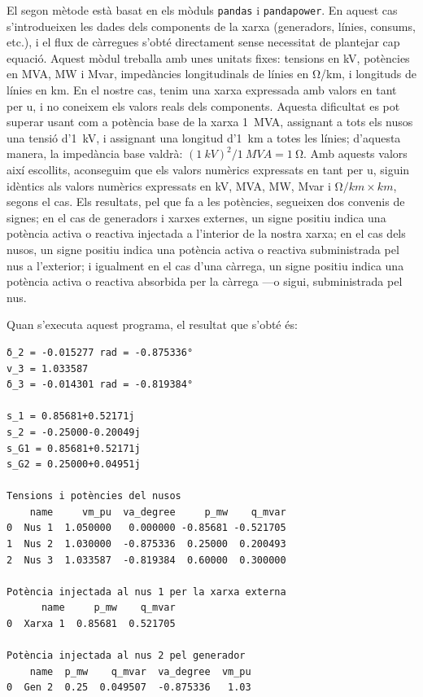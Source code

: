 El segon mètode està basat en els mòduls \texttt{pandas} i \texttt{pandapower}. En aquest cas s'introdueixen les dades dels components de la xarxa (generadors, línies, consums, etc.), i el flux de càrregues s'obté directament sense necessitat de plantejar cap equació. Aquest mòdul treballa amb unes unitats fixes: tensions en  \unit{kV}, potències en  \unit{MVA}, \unit{MW} i \unit{Mvar}, impedàncies longitudinals de línies en \unit{\ohm/km}, i longituds de línies en  \unit{km}. En el nostre cas, tenim una xarxa expressada amb valors en tant per u, i no coneixem els valors reals dels components. Aquesta dificultat es pot superar usant com a potència base de la xarxa \qty{1}{MVA}, assignant a tots els nusos una tensió d'\qty{1}{kV}, i assignant una longitud d'\qty{1}{km} a totes les línies; d'aquesta manera, la impedància base valdrà: $(\qty{1}{kV})^2/\qty{1}{MVA} = \qty{1}{\ohm}$. Amb aquests valors així escollits, aconseguim que els valors numèrics expressats en tant per u, siguin idèntics als valors numèrics expressats en
\unit{kV},  \unit{MVA}, \unit{MW}, \unit{Mvar} i $\unit{\ohm/km}\times\unit{km}$, segons el cas. Els resultats, pel que fa a les potències,  segueixen dos convenis de signes; en el cas de generadors i xarxes externes, un signe positiu indica una potència activa o reactiva injectada a l'interior de la nostra xarxa; en el cas dels nusos, un signe positiu indica una potència activa o reactiva subministrada pel nus a l'exterior; i igualment en el cas d'una càrrega, un signe positiu indica una potència activa o reactiva absorbida per la càrrega ---o sigui, subministrada  pel nus.


Quan s'executa aquest programa, el resultat que s'obté és:
\lstset{
	language=,
	numbers=none,
	frame=none
}
\begin{lstlisting}
δ_2 = -0.015277 rad = -0.875336°
v_3 = 1.033587
δ_3 = -0.014301 rad = -0.819384°

s_1 = 0.85681+0.52171j
s_2 = -0.25000-0.20049j
s_G1 = 0.85681+0.52171j
s_G2 = 0.25000+0.04951j

Tensions i potències del nusos
    name     vm_pu  va_degree     p_mw    q_mvar
0  Nus 1  1.050000   0.000000 -0.85681 -0.521705
1  Nus 2  1.030000  -0.875336  0.25000  0.200493
2  Nus 3  1.033587  -0.819384  0.60000  0.300000

Potència injectada al nus 1 per la xarxa externa
      name     p_mw    q_mvar
0  Xarxa 1  0.85681  0.521705

Potència injectada al nus 2 pel generador
    name  p_mw    q_mvar  va_degree  vm_pu
0  Gen 2  0.25  0.049507  -0.875336   1.03
\end{lstlisting} 


